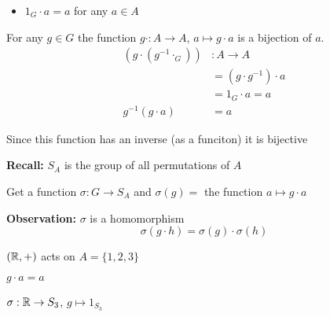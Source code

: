 \begin{itemize}
  \item $1_G \cdot a = a$ for any $a \in A$
\end{itemize}

For any $g \in G$ the function $g\cdot: A \to A$, $a \mapsto g\cdot a$ is a bijection of $a$.
\begin{align*}
(g\cdot(g^{-1}\cdot_G))&: A \to A\\
  &= (g\cdot g^{-1})\cdot a\\
  &= 1_G\cdot a = a\\
  g^{-1}(g\cdot a) &= a
\end{align*} 

Since this function has an inverse (as a funciton) it is bijective

\textbf{Recall: } $S_A$ is the group of all permutations of $A$

Get a function $\sigma: G \to S_A$ and $\sigma(g) = $ the function $a \mapsto g\cdot a$

\textbf{Observation: }$\sigma$ is a homomorphism
\[\sigma(g\cdot h) = \sigma(g)\cdot\sigma(h)\]

\begin{example}
  $(\mathbb R, +)$ acts on $A = \{1, 2, 3\}$ 

  $g\cdot a = a$

  $\sigma: \mathbb R \to S_3$, $g \mapsto 1_{S_3}$
\end{example}